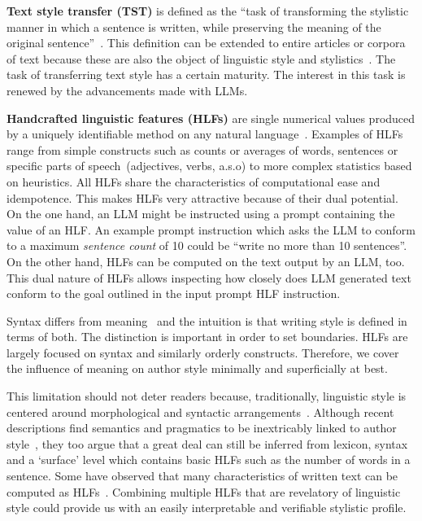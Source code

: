 \documentclass[a4paper,twoside]{article}
\begin{document}
\textbf{Text style transfer (TST)} is defined as the ``task of transforming the
stylistic manner in which a sentence is written, while preserving the meaning of
the original sentence''~\cite{tst-review-2021}.
This definition can be extended to entire articles or corpora of text because
these are also the object of linguistic style and
stylistics~\cite{lugea2023stylistics}.
The task of transferring text style has a certain maturity.
The interest in this task is renewed by the advancements made with LLMs.

\textbf{Handcrafted linguistic features (HLFs)} are single numerical values
produced by a uniquely identifiable method on any natural
language~\cite{lftk-2023}.
Examples of HLFs range from simple constructs such as counts or averages of
words, sentences or specific parts of speech~(adjectives, verbs, a.s.o) to more
complex statistics based on heuristics.
All HLFs share the characteristics of computational ease and idempotence.
This makes HLFs very attractive because of their dual potential.
On the one hand, an LLM might be instructed using a prompt containing the value
of an HLF.\@
An example prompt instruction which asks the LLM to conform to a maximum
\textit{sentence count} of 10 could be ``write no more than 10 sentences''.
On the other hand, HLFs can be computed on the text output by an LLM, too.
This dual nature of HLFs allows inspecting how closely does LLM generated text
conform to the goal outlined in the input prompt HLF instruction.\@

Syntax differs from meaning~\cite{chomsky2002syntactic} and the intuition is
that writing style is defined in terms of both.
The distinction is important in order to set boundaries.
HLFs are largely focused on syntax and similarly orderly constructs.
Therefore, we cover the influence of meaning on author style minimally and
superficially at best.

This limitation should not deter readers because, traditionally, linguistic
style is centered around morphological and syntactic
arrangements~\cite{lugea2023stylistics}.
Although recent descriptions find semantics and pragmatics to be inextricably
linked to author style~\cite{verma2019lexical}, they too argue that a great deal
can still be inferred from lexicon, syntax and a `surface' level which contains
basic HLFs such as the number of words in a sentence.
Some have observed that many characteristics of written text can be computed as
HLFs~\cite{hovy1987generating,lugea2023stylistics}.
Combining multiple HLFs that are revelatory of linguistic style could provide us
with an easily interpretable and verifiable stylistic profile.
\end{document}
